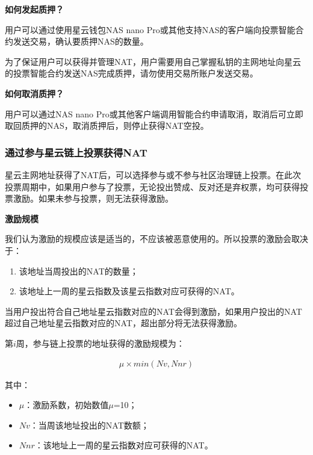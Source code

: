 \textbf{如何发起质押？} 
	
用户可以通过使用星云钱包NAS nano Pro或其他支持NAS的客户端向投票智能合约发送交易，确认要质押NAS的数量。

为了保证用户可以获得并管理NAT，用户需要用自己掌握私钥的主网地址向星云的投票智能合约发送NAS完成质押，请勿使用交易所账户发送交易。

\vspace{2em}

\textbf{如何取消质押？}

用户可以通过NAS nano Pro或其他客户端调用智能合约申请取消，取消后可立即取回质押的NAS，取消质押后，则停止获得NAT空投。

\subsubsection{通过参与星云链上投票获得NAT}

星云主网地址获得了NAT后，可以选择参与或不参与社区治理链上投票。在此次投票周期中，如果用户参与了投票，无论投出赞成、反对还是弃权票，均可获得投票激励。如果未参与投票，则无法获得激励。

\vspace{2em}

\textbf{激励规模}

我们认为激励的规模应该是适当的，不应该被恶意使用的。所以投票的激励会取决于：

\begin{enumerate}
	\item 该地址当周投出的NAT的数量；
	\item 该地址上一周的星云指数及该星云指数对应可获得的NAT。
\end{enumerate}

当用户投出符合自己地址星云指数对应的NAT会得到激励，如果用户投出的NAT超过自己地址星云指数对应的NAT，超出部分将无法获得激励。
	
第$i$周，参与链上投票的地址获得的激励规模为：

\begin{align}
\mu\times min(Nv, Nnr)
\end{align}

其中：

\begin{itemize}
	\item $\mu$：激励系数，初始数值$\mu$=10；
	\item $Nv$：当周该地址投出的NAT数额；
	\item $Nnr$：该地址上一周的星云指数对应可获得的NAT。
\end{itemize}

